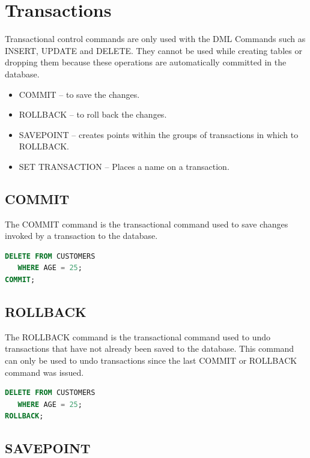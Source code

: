 \documentclass{article}
\begin{document}
\newpage
\section{Transactions}

Transactional control commands are only used with the DML Commands such as INSERT, UPDATE and DELETE. They cannot be used while creating tables or dropping them because these operations are automatically committed in the database.

\begin{itemize}
    \item COMMIT -- to save the changes.
    \item ROLLBACK -- to roll back the changes.
    \item SAVEPOINT -- creates points within the groups of transactions in which to ROLLBACK.
    \item  SET TRANSACTION -- Places a name on a transaction.
\end{itemize}

\subsection{COMMIT}

The COMMIT command is the transactional command used to save changes invoked by a transaction to the database.

\vspace{8pt} \begin{lstlisting}[language=SQL]
DELETE FROM CUSTOMERS
   WHERE AGE = 25;
COMMIT;
\end{lstlisting} \vspace{8pt}

\subsection{ROLLBACK}

The ROLLBACK command is the transactional command used to undo transactions that have not already been saved to the database. This command can only be used to undo transactions since the last COMMIT or ROLLBACK command was issued.

\vspace{8pt} \begin{lstlisting}[language=SQL]
DELETE FROM CUSTOMERS
   WHERE AGE = 25;
ROLLBACK;
\end{lstlisting} \vspace{8pt}

\subsection{SAVEPOINT}
\end{document}
